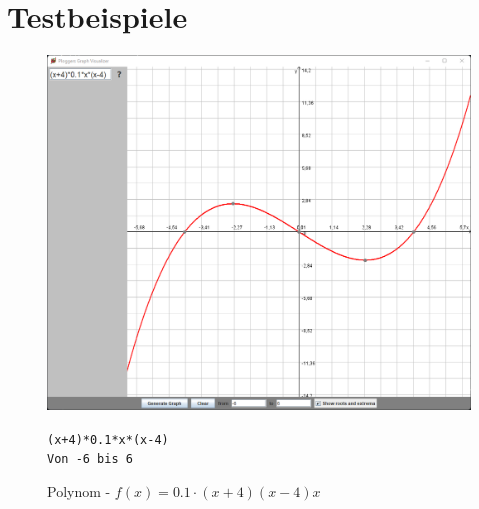 \documentclass[12pt]{article}
\begin{document}
	\section*{Testbeispiele}

	\begin{figure}[!ht]
		\begin{center}
			\includegraphics[scale=0.5]{images/sample1.png}
		\end{center}
		\caption{Polynom - $f(x) = 0.1 \cdot (x+4)(x-4)x$}
		
		\begin{center}
			\texttt{(x+4)*0.1*x*(x-4)} \\
			\texttt{Von -6 bis 6}
		\end{center}
	\end{figure}
\end{document}
